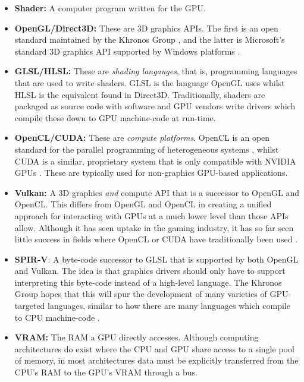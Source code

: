 \documentclass[a4paper,12pt,twoside,openright]{report}
\begin{document}
\begin{itemize}

    \item \textbf{Shader:} A computer program written for the GPU.

    \item \textbf{OpenGL/Direct3D:} These are 3D graphics APIs. The first is an
    open standard maintained by the Khronos Group \cite{OpenGL}, and the latter
    is Microsoft's standard 3D graphics API supported by Windows platforms
    \cite{Direct3D}.

    \item \textbf{GLSL/HLSL:} These are \textit{shading langauges}, that is,
    programming languages that are used to write shaders. GLSL is the language
    OpenGL uses whilst HLSL is the equivalent found in Direct3D. Traditionally,
    shaders are packaged as source code with software and GPU vendors write
    drivers which compile these down to GPU machine-code at run-time.

    \item \textbf{OpenCL/CUDA:} These are \textit{compute platforms}. OpenCL is
    an open standard for the parallel programming of heterogeneous systems
    \cite{OpenCL}, whilst CUDA is a similar, proprietary system that is only
    compatible with NVIDIA GPUs \cite{CUDA}. These are typically used for non-graphics
    GPU-based applications.

    \item \textbf{Vulkan:} A 3D graphics \textit{and} compute API \cite{Vulkan}
    that is a successor to OpenGL and OpenCL. This differs from OpenGL and
    OpenCL in creating a unified approach for interacting with GPUs at a much
    lower level than those APIs allow. Although it has seen uptake in the gaming
    industry, it has so far seen little success in fields where OpenCL or CUDA
    have traditionally been used \cite{TODO}.

    \item \textbf{SPIR-V}: A byte-code successor to GLSL that is supported by
    both OpenGL and Vulkan. The idea is that graphics drivers should only have
    to support interpreting this byte-code instead of a high-level language.
    The Khronos Group hopes that this will spur the development of many
    varieties of GPU-targeted languages, similar to how there are many
    languages which compile to CPU machine-code \cite{TODO}.

    \item \textbf{VRAM:} The RAM a GPU directly accesses. Although computing
    architectures do exist where the CPU and GPU share access to a single pool
    of memory, in most architectures data must be explicitly transferred from
    the CPU's RAM to the GPU's VRAM through a bus.


\end{itemize}
\end{document}
